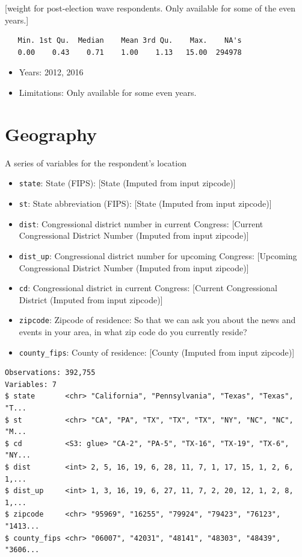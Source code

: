 \documentclass[10pt,article,oneside]{memoir}
\theoremstyle{definition}
\begin{document}
{[}weight for post-election wave respondents. Only available for some of
the even years.{]}

\begin{verbatim}
   Min. 1st Qu.  Median    Mean 3rd Qu.    Max.    NA's 
   0.00    0.43    0.71    1.00    1.13   15.00  294978 
\end{verbatim}

\begin{itemize}
\tightlist
\item
  Years: 2012, 2016
\item
  Limitations: Only available for some even years.
\end{itemize}

\hypertarget{geography}{%
\section{Geography}\label{geography}}

A series of variables for the respondent's location

\begin{itemize}
\tightlist
\item
  \texttt{state}: State (FIPS): {[}State (Imputed from input zipcode){]}
\item
  \texttt{st}: State abbreviation (FIPS): {[}State (Imputed from input
  zipcode){]}
\item
  \texttt{dist}: Congressional district number in current Congress:
  {[}Current Congressional District Number (Imputed from input
  zipcode){]}
\item
  \texttt{dist\_up}: Congressional district number for upcoming
  Congress: {[}Upcoming Congressional District Number (Imputed from
  input zipcode){]}
\item
  \texttt{cd}: Congressional district in current Congress: {[}Current
  Congressional District (Imputed from input zipcode){]}
\item
  \texttt{zipcode}: Zipcode of residence: So that we can ask you about
  the news and events in your area, in what zip code do you currently
  reside?
\item
  \texttt{county\_fips}: County of residence: {[}County (Imputed from
  input zipcode){]}
\end{itemize}

\begin{verbatim}
Observations: 392,755
Variables: 7
$ state       <chr> "California", "Pennsylvania", "Texas", "Texas", "T...
$ st          <chr> "CA", "PA", "TX", "TX", "TX", "NY", "NC", "NC", "M...
$ cd          <S3: glue> "CA-2", "PA-5", "TX-16", "TX-19", "TX-6", "NY...
$ dist        <int> 2, 5, 16, 19, 6, 28, 11, 7, 1, 17, 15, 1, 2, 6, 1,...
$ dist_up     <int> 1, 3, 16, 19, 6, 27, 11, 7, 2, 20, 12, 1, 2, 8, 1,...
$ zipcode     <chr> "95969", "16255", "79924", "79423", "76123", "1413...
$ county_fips <chr> "06007", "42031", "48141", "48303", "48439", "3606...
\end{verbatim}
\end{document}
